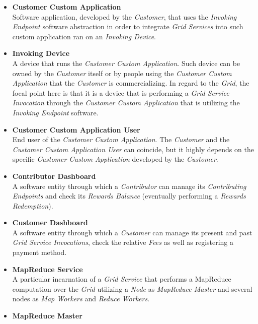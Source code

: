 \begin{itemize}
    \item \textbf{Customer Custom Application}\label{customer_custom_application}\\
    Software application, developed by the \textit{Customer}, that uses the \textit{Invoking Endpoint} software abstraction in order to integrate \textit{Grid Services} into such custom application ran on an \textit{Invoking Device}.
    \vspace{10mm}
    \item \textbf{Invoking Device}\label{invoking_device}\\
    A device that runs the \textit{Customer Custom Application}. Such device can be owned by the \textit{Customer} itself or by people using the \textit{Customer Custom Application} that the \textit{Customer} is commercializing. In regard to the \textit{Grid}, the focal point here is that it is a device that is performing a \textit{Grid Service Invocation} through the \textit{Customer Custom Application} that is utilizing the \textit{Invoking Endpoint} software.
    \item \textbf{Customer Custom Application User}\label{customer_custom_application_user}\\
    End user of the \textit{Customer Custom Application}. The \textit{Customer} and the \textit{Customer Custom Application User} can coincide, but it highly depends on the specific \textit{Customer Custom Application} developed by the \textit{Customer}.
    \item \textbf{Contributor Dashboard}\label{contributor_dashboard}\\
    A software entity through which a \textit{Contributor} can manage its \textit{Contributing Endpoints} and check its \textit{Rewards Balance} (eventually performing a \textit{Rewards Redemption}).
    \item \textbf{Customer Dashboard}\label{customer_dashboard}\\
    A software entity through which a \textit{Customer} can manage its present and past \textit{Grid Service Invocations}, check the relative \textit{Fees} as well as registering a payment method.
    \item \textbf{MapReduce Service}\label{mapreduce_service_ul}\\
    A particular incarnation of a \textit{Grid Service} that performs a MapReduce computation over the \textit{Grid} utilizing a \textit{Node} as \textit{MapReduce Master} and several nodes as \textit{Map Workers} and \textit{Reduce Workers}.
    \item \textbf{MapReduce Master}\label{mapreduce_master}\\

\end{itemize}
